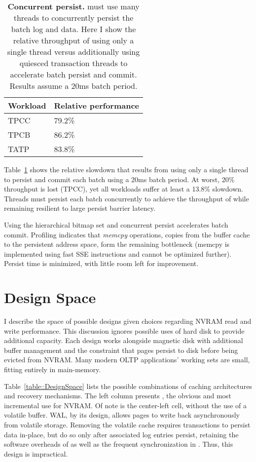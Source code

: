 \begin{table}
  \centering
  \begin{tabular}{l l}
    \hline
    Workload & Relative performance \\
    \hline \hline
    TPCC & 79.2\% \\
    TPCB & 86.2\% \\
    TATP & 83.8\% \\
    \hline
  \end{tabular}
  \caption{\textbf{Concurrent \GroupCommit persist.} \GroupCommit must use many threads to concurrently persist the batch log and data.  Here I show the relative throughput of using only a single thread versus additionally using quiesced transaction threads to accelerate batch persist and commit.  Results assume a 20ms batch period.}
  \label{table::ConcurrentPersist}
\end{table}

Table~\ref{table::ConcurrentPersist} shows the relative slowdown that results from using only a single thread to persist and commit each batch using a 20ms batch period.
At worst, 20\% throughput is lost (TPCC), yet all workloads suffer at least a 13.8\% slowdown.
Threads must persist each batch concurrently to achieve the throughput of \InPlace while remaining resilient to large persist barrier latency.

Using the hierarchical bitmap set and concurrent persist accelerates batch commit.
Profiling indicates that \emph{memcpy} operations, copies from the buffer cache to the persistent address space, form the remaining bottleneck (memcpy is implemented using fast SSE instructions and cannot be optimized further).
Persist time is minimized, with little room left for improvement.

\section{Design Space}
\label{sec:OLTP_design:Designs}
I describe the space of possible designs given choices regarding NVRAM read and write performance.
This discussion ignores possible uses of hard disk to provide additional capacity.
Each design works alongside magnetic disk with additional buffer management and the constraint that pages persist to disk before being evicted from NVRAM.
Many modern OLTP applications' working sets are small, fitting entirely in main-memory.

Table~\ref{table::DesignSpace} lists the possible combinations of caching architectures and recovery mechanisms.
The left column presents \NVDisk, the obvious and most incremental use for NVRAM.
Of note is the center-left cell, \NVDisk without the use of a volatile buffer.
WAL, by its design, allows pages to write back asynchronously from volatile storage.
Removing the volatile cache requires transactions to persist data in-place, but do so only after associated log entries persist, retaining the software overheads of \NVDisk as well as the frequent synchronization in \InPlace.
Thus, this design is impractical.

